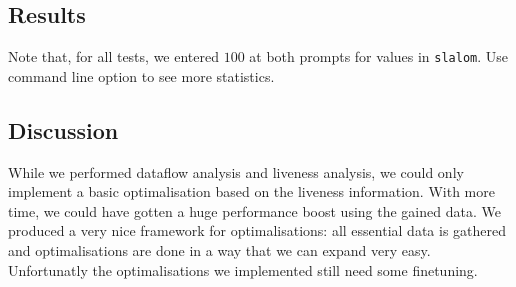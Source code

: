 
\subsection{Results}

Note that, for all tests, we entered $100$ at both prompts for values in
\texttt{slalom}. Use command line option  to see more statistics.



\subsection{Discussion}
While we performed dataflow analysis and liveness analysis, we could only 
implement a basic optimalisation based on the liveness information. With more
time, we could have gotten a huge performance boost using the gained data. We 
produced a very nice framework for optimalisations: all essential data is
gathered and optimalisations are done in a way that we can expand very easy. 
Unfortunatly the optimalisations we implemented still need some finetuning.
